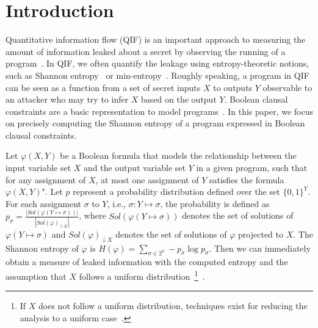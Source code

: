 \section{Introduction}
\label{sec:Intro}

Quantitative information flow (QIF) is an important approach to measuring the amount of information leaked about a secret by observing the running of a program~\cite{denning1982cryptography, gray1992toward}.
In QIF, we often quantify the leakage using entropy-theoretic notions, such as Shannon entropy~\cite{backes2009automatic, cerny2011complexity, phan2012symbolic, smith2009foundations} or
min-entropy~\cite{backes2009automatic, meng2011calculating, phan2012symbolic, smith2009foundations}.
Roughly speaking, a program in QIF can be seen as a function from a set of secret inputs $X$ to outputs $Y$ observable to an attacker who may try to infer $X$ based on the output $Y$.
Boolean clausal constraints are a basic representation to model programs~\cite{fremont2017maximum, golia2022scalable}. 
In this paper, we focus on precisely computing the Shannon entropy of a program expressed in Boolean clausal constraints.


Let $\varphi(X,Y)$ be a Boolean formula that models the relationship between the input variable set $X$ and the output variable set $Y$ in a given program, such that for any assignment of $X$, at most one assignment of $Y$ satisfies the formula $\varphi(X,Y)$".
Let $p$ represent a probability distribution defined over the set $\{0,1\}^Y$.
For each assignment $\sigma$ to $Y$, i.e., $\sigma:Y \mapsto \sigma$, the probability is defined as $p_{\sigma} = \frac{\left| \mathit{Sol}(\varphi(Y \mapsto \sigma)) \right|}{ \left| \mathit{Sol}(\varphi)_{\downarrow X} \right| }$, where $\mathit{Sol}(\varphi(Y \mapsto \sigma))$ denotes the set of solutions of $\varphi(Y \mapsto \sigma)$ and $\mathit{Sol}(\varphi)_{\downarrow X}$ denotes the set of solutions of $\varphi$ projected to $X$.
The Shannon entropy of $\varphi$ is $H(\varphi) = \sum_{\sigma \in 2^Y} -p_{\sigma} \log p_{\sigma} $.
Then we can immediately obtain a measure of leaked information with the computed entropy and the assumption that $X$ follows a uniform distribution~\footnote{If $X$ does not follow a uniform distribution, techniques exist
	for reducing the analysis to a uniform case~\cite{backes2011non}.}~\cite{klebanov2013sat}. 

